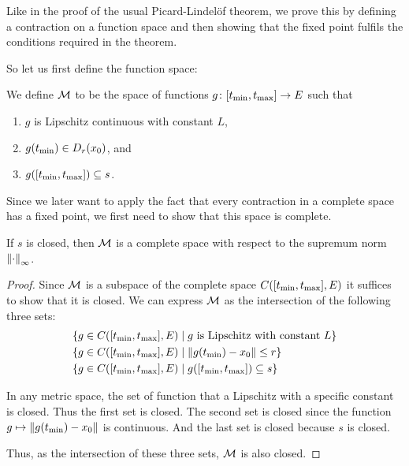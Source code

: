 Like in the proof of the usual Picard-Lindelöf theorem, we prove this by defining a contraction on a function space and then showing that the fixed point fulfils the conditions required in the theorem. 

So let us first define the function space: 

\begin{defi}
We define $\mathcal{M}$ to be the space of functions $g \colon [t_{\text{min}}, t_{\text{max}}] \to E$ such that
\begin{enumerate}
    \item $g$ is Lipschitz continuous with constant $L$,
    \item $g (t_{\text{min}}) \in D_{r}(x_0)$, and 
    \item $g ([t_{\text{min}}, t_{\text{max}}]) \subseteq s$.
\end{enumerate}
\end{defi}

Since we later want to apply the fact that every contraction in a complete space has a fixed point, we first need to show that this space is complete. 

\begin{lem}\label{lem:completeSpace}
If $s$ is closed, then $\mathcal{M}$ is a complete space with respect to the supremum norm $\left\lVert\cdot\right\rVert_\infty$.  
\end{lem}
\begin{proof}
Since $\mathcal{M}$ is a subspace of the complete space $C([t_{\text{min}}, t_{\text{max}}], E)$ it suffices to show that it is closed. 
We can express $\mathcal{M}$ as the intersection of the following three sets: 
\begin{equation*}
    \begin{split}
    \{g \in C([t_{\text{min}}, t_{\text{max}}], E) &\mid g \text{ is Lipschitz with constant } L\} \\
    \{g \in C([t_{\text{min}}, t_{\text{max}}], E) &\mid \left\lVert g (t_{\text{min}}) - x_0\right\rVert \le r\} \\ 
    \{g \in C([t_{\text{min}}, t_{\text{max}}], E) &\mid g ([t_{\text{min}}, t_{\text{max}}]) \subseteq s\}
    \end{split}
\end{equation*}

In any metric space, the set of function that a Lipschitz with a specific constant is closed. Thus the first set is closed. 
The second set is closed since the function $g \mapsto \left\lVert g (t_{\text{min}}) - x_0\right\rVert$ is continuous. 
And the last set is closed because $s$ is closed. 

Thus, as the intersection of these three sets, $\mathcal{M}$ is also closed. 

\end{proof}

